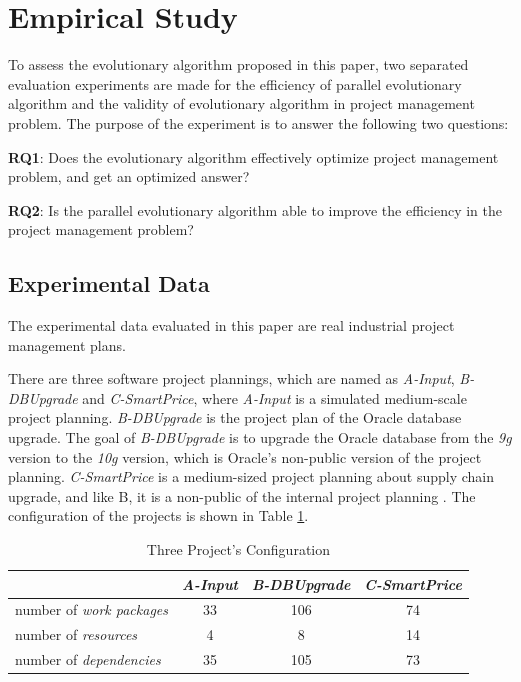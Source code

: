 %
%

\section{Empirical Study}
%
To assess the evolutionary algorithm proposed in this paper, two separated
evaluation experiments are made for the efficiency of parallel evolutionary
algorithm and the validity of evolutionary algorithm in project management
problem. The purpose of the experiment is to answer the following two questions:


\textbf{RQ1}: Does the evolutionary algorithm effectively optimize project
management problem, and get an optimized answer?

\textbf{RQ2}: Is the parallel evolutionary algorithm able to improve the
efficiency in the project management problem?


\subsection{Experimental Data}
%
The experimental data evaluated in this paper are real industrial project
management plans.


There are three software project plannings, which are named as \emph{A-Input},
\emph{B-DBUpgrade} and \emph{C-SmartPrice}, where \emph{A-Input} is a simulated
medium-scale project planning. \emph{B-DBUpgrade} is the project plan of the
Oracle database upgrade. The goal of \emph{B-DBUpgrade} is to upgrade the Oracle
database from the \emph{9g} version to the \emph{10g} version, which is Oracle's
non-public version of the project planning. \emph{C-SmartPrice} is a
medium-sized project planning about supply chain upgrade, and like B, it is a
non-public of the internal project planning \cite{ren}. The configuration of the
projects is shown in Table \ref{tab:statis}.

\begin{table}
  \centering
  \caption{Three Project's Configuration}
  \label{tab:statis}
  \begin{tabular}{lccc}
    \hline
      & \emph{ A-Input } & \emph{ B-DBUpgrade } & \emph{ C-SmartPrice } \\
    \hline
    number of \emph{work packages} & 33 & 106 & 74 \\
    number of \emph{resources}     & 4  & 8   & 14 \\
    number of \emph{dependencies}  & 35 & 105 & 73 \\
    \hline
  \end{tabular}
\end{table}


